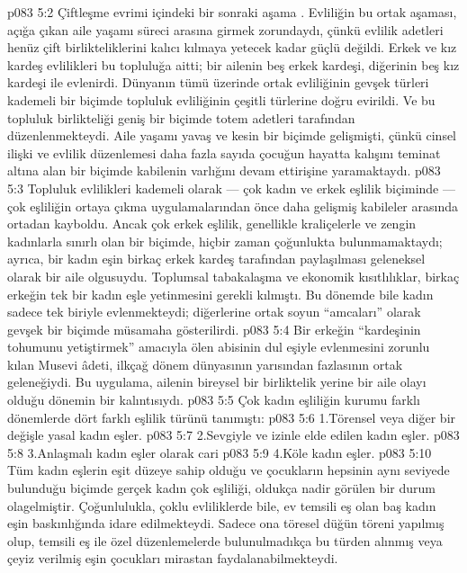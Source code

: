 \vs p083 5:2 Çiftleşme evrimi içindeki bir sonraki aşama . Evliliğin bu ortak aşaması, açığa çıkan aile yaşamı süreci arasına girmek zorundaydı, çünkü evlilik adetleri henüz çift birlikteliklerini kalıcı kılmaya yetecek kadar güçlü değildi. Erkek ve kız kardeş evlilikleri bu topluluğa aitti; bir ailenin beş erkek kardeşi, diğerinin beş kız kardeşi ile evlenirdi. Dünyanın tümü üzerinde ortak evliliğinin gevşek türleri kademeli bir biçimde topluluk evliliğinin çeşitli türlerine doğru evirildi. Ve bu topluluk birlikteliği geniş bir biçimde totem adetleri tarafından düzenlenmekteydi. Aile yaşamı yavaş ve kesin bir biçimde gelişmişti, çünkü cinsel ilişki ve evlilik düzenlemesi daha fazla sayıda çocuğun hayatta kalışını teminat altına alan bir biçimde kabilenin varlığını devam ettirişine yaramaktaydı.
\vs p083 5:3 Topluluk evlilikleri kademeli olarak --- çok kadın ve erkek eşlilik biçiminde --- çok eşliliğin ortaya çıkma uygulamalarından önce daha gelişmiş kabileler arasında ortadan kayboldu. Ancak çok erkek eşlilik, genellikle kraliçelerle ve zengin kadınlarla sınırlı olan bir biçimde, hiçbir zaman çoğunlukta bulunmamaktaydı; ayrıca, bir kadın eşin birkaç erkek kardeş tarafından paylaşılması geleneksel olarak bir aile olgusuydu. Toplumsal tabakalaşma ve ekonomik kısıtlılıklar, birkaç erkeğin tek bir kadın eşle yetinmesini gerekli kılmıştı. Bu dönemde bile kadın sadece tek biriyle evlenmekteydi; diğerlerine ortak soyun “amcaları” olarak gevşek bir biçimde müsamaha gösterilirdi.
\vs p083 5:4 Bir erkeğin “kardeşinin tohumunu yetiştirmek” amacıyla ölen abisinin dul eşiyle evlenmesini zorunlu kılan Musevi âdeti, ilkçağ dönem dünyasının yarısından fazlasının ortak geleneğiydi. Bu uygulama, ailenin bireysel bir birliktelik yerine bir aile olayı olduğu dönemin bir kalıntısıydı.
\vs p083 5:5 Çok kadın eşliliğin kurumu farklı dönemlerde dört farklı eşlilik türünü tanımıştı:
\vs p083 5:6 1.\bibnobreakspace Törensel veya diğer bir değişle yasal kadın eşler.
\vs p083 5:7 2.\bibnobreakspace Sevgiyle ve izinle elde edilen kadın eşler.
\vs p083 5:8 3.\bibnobreakspace Anlaşmalı kadın eşler olarak cari
\vs p083 5:9 4.\bibnobreakspace Köle kadın eşler.
\vs p083 5:10 Tüm kadın eşlerin eşit düzeye sahip olduğu ve çocukların hepsinin aynı seviyede bulunduğu biçimde gerçek kadın çok eşliliği, oldukça nadir görülen bir durum olagelmiştir. Çoğunlulukla, çoklu evliliklerde bile, ev temsili eş olan baş kadın eşin baskınlığında idare edilmekteydi. Sadece ona töresel düğün töreni yapılmış olup, temsili eş ile özel düzenlemelerde bulunulmadıkça bu türden alınmış veya çeyiz verilmiş eşin çocukları mirastan faydalanabilmekteydi.
